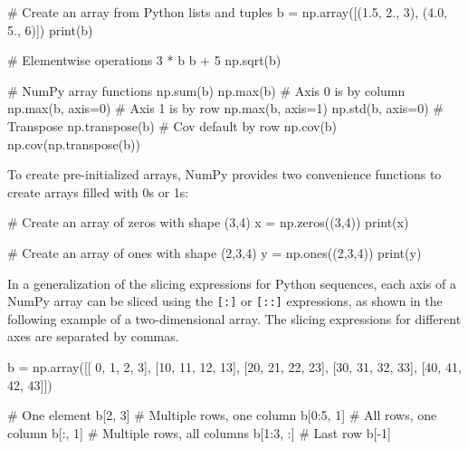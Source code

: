 \begin{samepage}
\begin{pythoncode}
# Create an array from Python lists and tuples
b = np.array([(1.5, 2., 3), 
              (4.0, 5., 6)])
print(b)

# Elementwise operations
3 * b
b + 5
np.sqrt(b)

# NumPy array functions
np.sum(b)
np.max(b)
# Axis 0 is by column
np.max(b, axis=0)
# Axis 1 is by row
np.max(b, axis=1)
np.std(b, axis=0)
# Transpose
np.transpose(b)
# Cov default by row
np.cov(b)
np.cov(np.transpose(b))
\end{pythoncode}
\end{samepage}


To create pre-initialized arrays, NumPy provides two convenience functions to create arrays filled with 0s or 1s:
\begin{samepage}
\begin{pythoncode}
# Create an array of zeros with shape (3,4)
x = np.zeros((3,4))
print(x)

# Create an array of ones with shape (2,3,4)
y = np.ones((2,3,4))
print(y)
\end{pythoncode}
\end{samepage}

In a generalization of the slicing expressions for Python sequences, each axis of a NumPy array can be sliced using the \texttt{[:]} or \texttt{[::]} expressions, as shown in the following example of a two-dimensional array. The slicing expressions for different axes are separated by commas.

\begin{samepage}
\begin{pythoncode}
b = np.array([[ 0,  1,  2,  3],
              [10, 11, 12, 13],
              [20, 21, 22, 23],
              [30, 31, 32, 33],
              [40, 41, 42, 43]])
       
# One element              
b[2, 3]
# Multiple rows, one column
b[0:5, 1]
# All rows, one column
b[:, 1]
# Multiple rows, all columns
b[1:3, :]
# Last row
b[-1]
\end{pythoncode}
\end{samepage}

